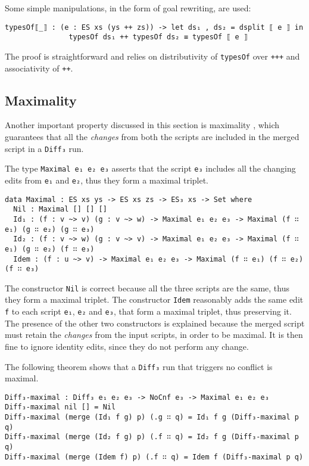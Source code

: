 \documentclass[../Thesis.tex]{subfiles}
\begin{document}
	Some simple manipulations, in the form of goal rewriting, are used:
\begin{verbatim}
typesOf⟦_⟧ : (e : ES xs (ys ++ zs)) -> let ds₁ , ds₂ = dsplit ⟦ e ⟧ in 
               typesOf ds₁ ++ typesOf ds₂ ≡ typesOf ⟦ e ⟧
\end{verbatim}
	The proof is straightforward and relies on distributivity of \texttt{typesOf} over \texttt{+++} and associativity of \texttt{++}.

	\subsection{Maximality}
	\label{subsec:Maximality}
	Another important property discussed in this section is maximality 
	\cite{Pierce07}, which guarantees that all the \emph{changes} from both
	the scripts are included in the merged script in a \texttt{Diff₃} run.
		
	The type \texttt{Maximal e₁ e₂ e₃} asserts that the script \texttt{e₃} includes
	all the changing edits from \texttt{e₁} and \texttt{e₂}, thus they
	form a maximal triplet.
	
\begin{verbatim}
data Maximal : ES xs ys -> ES xs zs -> ES₃ xs -> Set where
  Nil : Maximal [] [] []
  Id₁ : (f : v ~> v) (g : v ~> w) -> Maximal e₁ e₂ e₃ -> Maximal (f ∷ e₁) (g ∷ e₂) (g ∷ e₃)
  Id₂ : (f : v ~> w) (g : v ~> v) -> Maximal e₁ e₂ e₃ -> Maximal (f ∷ e₁) (g ∷ e₂) (f ∷ e₃)
  Idem : (f : u ~> v) -> Maximal e₁ e₂ e₃ -> Maximal (f ∷ e₁) (f ∷ e₂) (f ∷ e₃)
\end{verbatim}

	The constructor \texttt{Nil} is correct because all the three scripts
	are the same, thus they form a maximal triplet.
	The constructor \texttt{Idem} reasonably adds the same edit \texttt{f} 
	to each script \texttt{e₁}, \texttt{e₂} and \texttt{e₃}, that form a maximal 
	triplet, thus preserving it.
	The presence of the other two constructors is explained because 
	the merged script must retain the \emph{changes} from the 
	input scripts, in order to be maximal.
	It is then fine to ignore identity edits, since they do not perform any 
	change.
	
	The following theorem shows that a \texttt{Diff₃} run that triggers no
	conflict is maximal.
	
\begin{verbatim}
Diff₃-maximal : Diff₃ e₁ e₂ e₃ -> NoCnf e₃ -> Maximal e₁ e₂ e₃
Diff₃-maximal nil [] = Nil
Diff₃-maximal (merge (Id₁ f g) p) (.g ∷ q) = Id₁ f g (Diff₃-maximal p q)
Diff₃-maximal (merge (Id₂ f g) p) (.f ∷ q) = Id₂ f g (Diff₃-maximal p q)
Diff₃-maximal (merge (Idem f) p) (.f ∷ q) = Idem f (Diff₃-maximal p q)
\end{verbatim}
	
\end{document}
